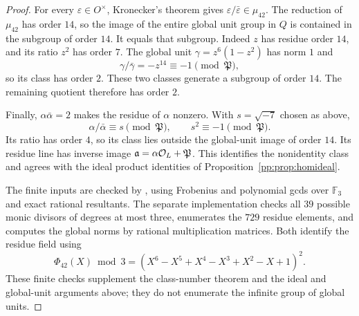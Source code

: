\begin{proof}
For every $\varepsilon\in O^{\times}$, Kronecker's theorem gives
$\varepsilon/\bar\varepsilon\in\mu_{42}$. The reduction of
$\mu_{42}$ has order $14$, so the image of the entire global unit
group in $Q$ is contained in the subgroup of order $14$.
It equals that subgroup. Indeed $z$ has residue order $14$,
and its ratio $z^2$ has order $7$. The global unit
$\gamma=z^6(1-z^2)$ has norm $1$ and
\[
 \gamma/\bar\gamma=-z^{14}\equiv-1\pmod{\mathfrak P},
\]
so its class has order $2$. These two classes generate a subgroup
of order $14$. The remaining quotient therefore has order $2$.

Finally, $\alpha\bar\alpha=2$ makes the residue of $\alpha$
nonzero. With $s=\sqrt{-7}$ chosen as above,
\[
 \alpha/\bar\alpha\equiv s\pmod{\mathfrak P},
 \qquad s^2\equiv-1\pmod{\mathfrak P}.
\]
Its ratio has order $4$, so its class lies outside the global-unit
image of order $14$. Its residue line has inverse image
$\mathfrak a=\alpha\mathcal O_L+\mathfrak P$. This identifies the
nonidentity class and agrees with the ideal product identities of
Proposition~\ref{pp:prop:homideal}.

The finite inputs are checked by
, using Frobenius
and polynomial gcds over $\mathbb F_3$ and exact rational resultants.
The separate implementation
 checks all $39$
possible monic divisors of degrees at most three, enumerates the
$729$ residue elements, and computes the global norms by rational
multiplication matrices. Both identify the residue field using
\[
 \Phi_{42}(X)\bmod3
 =(X^6-X^5+X^4-X^3+X^2-X+1)^2.
\]
These finite checks supplement the class-number theorem and the
ideal and global-unit arguments above; they do not enumerate
the infinite group of global units.
\end{proof}

